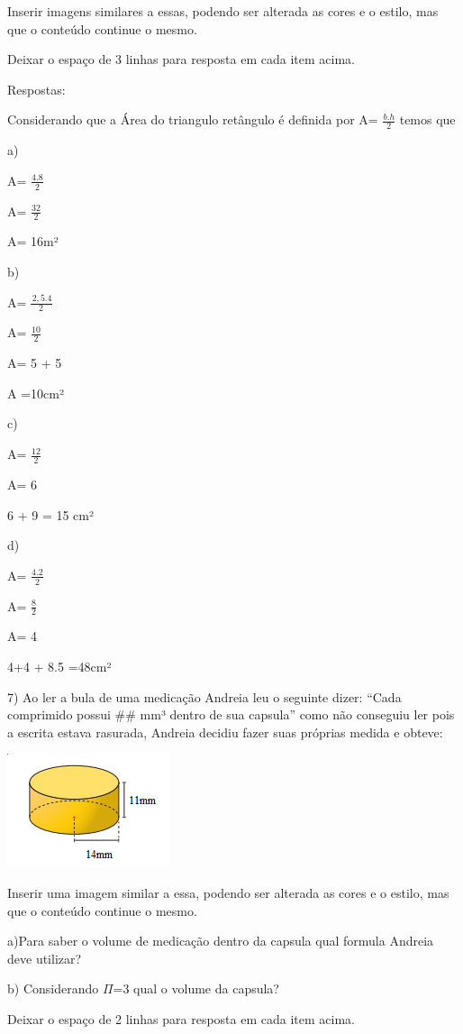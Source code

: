 Inserir imagens similares a essas, podendo ser alterada as cores e o
estilo, mas que o conteúdo continue o mesmo.

Deixar o espaço de 3 linhas para resposta em cada item acima.

Respostas:

Considerando que a Área do triangulo retângulo é definida por A=
\(\frac{b.h}{2}\) temos que

a)

A= \(\frac{4.8}{2}\)

A= \(\frac{32}{2}\)

A= 16m²

b)

A=\(\ \frac{\ 2,5.4}{2}\)

A= \(\frac{10}{2}\)

A= 5 + 5

A =10cm²

c)

A= \(\frac{12}{2}\)

A= 6

6 + 9 = 15 cm²

d)

A= \(\frac{4.2}{2}\)

A= \(\frac{8}{2}\)

A= 4

4+4 + 8.5 =48cm²

7) Ao ler a bula de uma medicação Andreia leu o seguinte dizer: ``Cada
comprimido possui \#\# mm³ dentro de sua capsula'' como não conseguiu
ler pois a escrita estava rasurada, Andreia decidiu fazer suas próprias
medida e obteve:

\includegraphics[width=1.88542in,height=1.3125in]{./imgSAEB_8_MAT/media/image50.png}

Inserir uma imagem similar a essa, podendo ser alterada as cores e o
estilo, mas que o conteúdo continue o mesmo.

a)Para saber o volume de medicação dentro da capsula qual formula
Andreia deve utilizar?

b) Considerando \(\Pi\)=3 qual o volume da capsula?

Deixar o espaço de 2 linhas para resposta em cada item acima.

